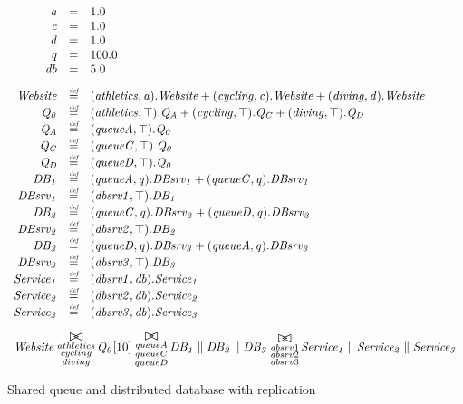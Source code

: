 \begin{figure}
	\caption{Shared queue and distributed database with replication}
	\label{figure:queueddrep}
	\centering
	\begin{displaymath}
	\begin{array}{rcl}
	\mathit{a} & = & 1.0\\
	\mathit{c} & = & 1.0\\
	\mathit{d} & = & 1.0\\
	\mathit{q} & = & 100.0\\
	\mathit{db} & = & 5.0\\
	[2.0ex]		\mathit{Website} & \rmdef & (\mathit{athletics},\mathit{a}).\mathit{Website}+(\mathit{cycling},\mathit{c}).\mathit{Website}+(\mathit{diving},\mathit{d}).\mathit{Website}\\
	\mathit{Q_0} & \rmdef & (\mathit{athletics},\top).\mathit{Q_A}+(\mathit{cycling},\top).\mathit{Q_C}+(\mathit{diving},\top).\mathit{Q_D}\\
	\mathit{Q_A} & \rmdef & (\mathit{queueA},\top).\mathit{Q_0}\\
	\mathit{Q_C} & \rmdef & (\mathit{queueC},\top).\mathit{Q_0}\\
	\mathit{Q_D} & \rmdef & (\mathit{queueD},\top).\mathit{Q_0}\\
	\mathit{DB_1} & \rmdef & (\mathit{queueA},\mathit{q}).\mathit{DBsrv_1}+(\mathit{queueC},\mathit{q}).\mathit{DBsrv_1}\\
	\mathit{DBsrv_1} & \rmdef & (\mathit{dbsrv1},\top).\mathit{DB_1}\\
	\mathit{DB_2} & \rmdef & (\mathit{queueC},\mathit{q}).\mathit{DBsrv_2}+(\mathit{queueD},\mathit{q}).\mathit{DBsrv_2}\\
	\mathit{DBsrv_2} & \rmdef & (\mathit{dbsrv2},\top).\mathit{DB_2}\\
	\mathit{DB_3} & \rmdef & (\mathit{queueD},\mathit{q}).\mathit{DBsrv_3}+(\mathit{queueA},\mathit{q}).\mathit{DBsrv_3}\\
	\mathit{DBsrv_3} & \rmdef & (\mathit{dbsrv3},\top).\mathit{DB_3}\\
	\mathit{Service_1} & \rmdef & (\mathit{dbsrv1},\mathit{db}).\mathit{Service_1}\\
	\mathit{Service_2} & \rmdef & (\mathit{dbsrv2},\mathit{db}).\mathit{Service_2}\\
	\mathit{Service_3} & \rmdef & (\mathit{dbsrv3},\mathit{db}).\mathit{Service_3}\\
	[2.0ex]		\multicolumn{3}{l}{\mathit{Website}\sync{\substack{athletics\\cycling\\diving}}\mathit{Q_0}[10]\sync{\substack{queueA\\queueC\\queueD}}\mathit{DB_1}\parallel\mathit{DB_2}\parallel\mathit{DB_3}\sync{\substack{dbsrv1\\dbsrv2\\dbsrv3}}\mathit{Service_1}\parallel\mathit{Service_2}\parallel\mathit{Service_3}}\\
	[2.0ex]	\end{array}
	\end{displaymath}
\end{figure}

